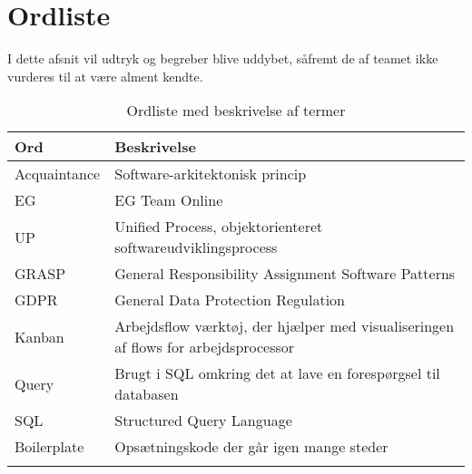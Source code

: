 \documentclass[../main.tex]{subfiles}
\begin{document}
\section*{Ordliste}
I dette afsnit vil udtryk og begreber blive uddybet, såfremt de af teamet ikke vurderes til at være alment kendte.
\begin{center}
   \small
   \begin{longtable}{| l | l |}
    \hline
    \textbf{Ord}												 &  \textbf{Beskrivelse} \\ \hline
    Acquaintance								 				     & Software-arkitektonisk princip   \\ \hline
    EG & EG Team Online\\ \hline
    UP													 & Unified Process, objektorienteret softwareudviklingsprocess \\ \hline
    GRASP						 &  General Responsibility Assignment Software Patterns\\ \hline
    GDPR											 & General Data Protection Regulation \\ \hline
    Kanban										 & Arbejdsflow værktøj, der hjælper med visualiseringen af flows for arbejdsprocessor \\ \hline
    Query &  Brugt i SQL omkring det at lave en forespørgsel til databasen\\ \hline
    SQL & Structured Query Language \\ \hline
	Boilerplate & Opsætningskode der går igen mange steder \\ \hline
    \caption{Ordliste med beskrivelse af termer}
    \label{tab:ordliste}
    \end{longtable}
\end{center}
\end{document}
